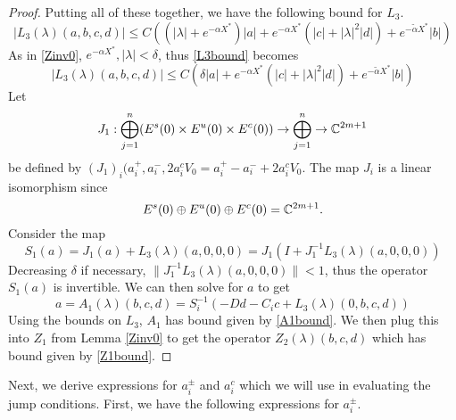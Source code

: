 \documentclass[thesis.tex]{subfiles}
\begin{document}
\begin{lemma}
\begin{proof}
Putting all of these together, we have the following bound for $L_3$.
\begin{equation}\label{L3bound}
|L_3(\lambda)(a, b, c, d)| \leq C \left( (|\lambda| + e^{-\alpha X^*})|a| + e^{-\alpha X^*}(|c| + |\lambda|^2 |d|) + e^{-\tilde{\alpha} X^*} |b| \right)
\end{equation}
As in \cref{Zinv0}, $e^{-\alpha X^*}, |\lambda| < \delta$, thus \cref{L3bound} becomes
\begin{equation*}
|L_3(\lambda)(a, b, c, d)| \leq C \left( \delta |a| + e^{-\alpha X^*}(|c| + |\lambda|^2 |d|) + e^{-\tilde{\alpha} X^*} |b| \right)
\end{equation*}
Let 
\[
J_1: \bigoplus_{j=1}^n (E^s(0) \times E^u(0) \times E^c(0) ) \rightarrow \bigoplus_{j=1}^n \rightarrow \mathbb{C}^{2m+1}
\]
be defined by $(J_1)_i(a_i^+, a_i^-, 2 a_i^c V_0 = a_i^+ - a_i^- + 2 a_i^c V_0$. The map $J_i$ is a linear isomorphism since 
\[
E^s(0) \oplus E^u(0) \oplus E^c(0) = \mathbb{C}^{2m+1}.
\]
Consider the map
\[
S_1(a) = J_1(a) + L_3(\lambda)(a, 0, 0, 0) = J_1\left( I + J_1^{-1} L_3(\lambda)(a, 0, 0, 0)\right)
\]
Decreasing $\delta$ if necessary, $\|J_1^{-1} L_3(\lambda)(a, 0, 0, 0)\| < 1$, thus the operator $S_1(a)$ is invertible. We can then solve for $a$ to get
\[
a = A_1(\lambda)(b, c, d) = S_i^{-1}\left(-D d - C_i c + L_3(\lambda)(0, b, c, d)\right)
\]
Using the bounds on $L_3$, $A_1$ has bound given by \cref{A1bound}. We then plug this into $Z_1$ from Lemma \ref{Zinv0} to get the operator $Z_2(\lambda)(b,c,d)$ which has bound given by \cref{Z1bound}.
\end{proof}
\end{lemma}

Next, we derive expressions for $a_i^\pm$ and $a_i^c$ which we will use in evaluating the jump conditions. First, we have the following expressions for $a_i^\pm$.
\end{document}
